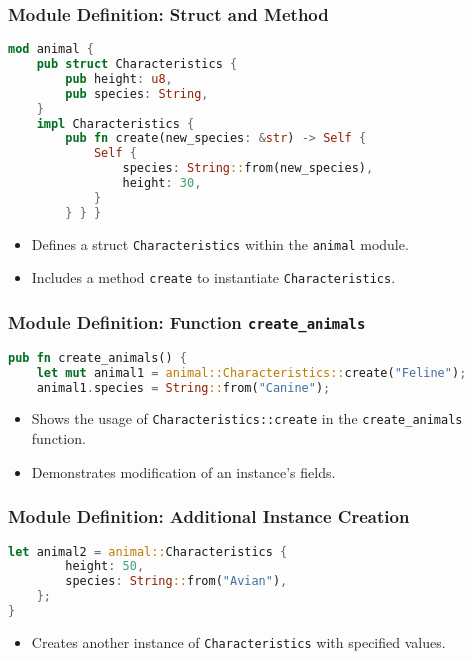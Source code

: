 \documentclass[aspectratio=169, table]{beamer}
\begin{document}
\begin{frame}[fragile]
\frametitle{Module Definition: Struct and Method}
\vspace{15pt}
\begin{lstlisting}[language=Rust]
mod animal {
	pub struct Characteristics {
		pub height: u8,
		pub species: String,
	}
	impl Characteristics {
		pub fn create(new_species: &str) -> Self {
			Self {
				species: String::from(new_species),
				height: 30,
			}
		} } }
\end{lstlisting}
\begin{itemize}
\item Defines a struct \texttt{Characteristics} within the \texttt{animal} module.
\item Includes a method \texttt{create} to instantiate \texttt{Characteristics}.
\end{itemize}
\end{frame}

\begin{frame}[fragile]
\frametitle{Module Definition: Function \texttt{create\_animals}}
\begin{lstlisting}[language=Rust]
pub fn create_animals() {
	let mut animal1 = animal::Characteristics::create("Feline");
	animal1.species = String::from("Canine");
\end{lstlisting}
\begin{itemize}
	\item Shows the usage of \texttt{Characteristics::create} in the \texttt{create\_animals} function.
	\item Demonstrates modification of an instance's fields.
\end{itemize}
\end{frame}

\begin{frame}[fragile]
\frametitle{Module Definition: Additional Instance Creation}
\begin{lstlisting}[language=Rust]
	let animal2 = animal::Characteristics {
		height: 50,
		species: String::from("Avian"),
	};
}
\end{lstlisting}
\begin{itemize}
\item Creates another instance of \texttt{Characteristics} with specified values.
\end{itemize}
\end{frame}
\end{document}
